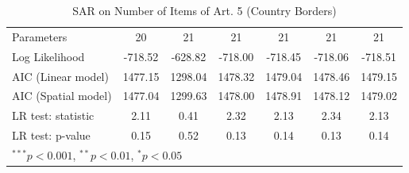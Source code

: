 \begin{table}[!h]
\begin{center}
\begin{tabular}{l c c c c c c }
Parameters              & 20           & 21           & 21           & 21           & 21           & 21           \\
Log Likelihood          & -718.52      & -628.82      & -718.00      & -718.45      & -718.06      & -718.51      \\
AIC (Linear model)      & 1477.15      & 1298.04      & 1478.32      & 1479.04      & 1478.46      & 1479.15      \\
AIC (Spatial model)     & 1477.04      & 1299.63      & 1478.00      & 1478.91      & 1478.12      & 1479.02      \\
LR test: statistic      & 2.11         & 0.41         & 2.32         & 2.13         & 2.34         & 2.13         \\
LR test: p-value        & 0.15         & 0.52         & 0.13         & 0.14         & 0.13         & 0.14         \\
\bottomrule
\multicolumn{7}{l}{\scriptsize{$^{***}p<0.001$, $^{**}p<0.01$, $^*p<0.05$}}
\end{tabular}
\caption{SAR on Number of Items of Art. 5 (Country Borders)}
\label{table:coefficients}
\end{center}
\end{table}
